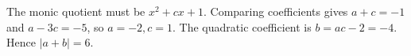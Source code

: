 The monic quotient must be $x^2+cx+1$. Comparing coefficients gives $a+c=-1$ and $a-3c=-5$, so $a=-2,c=1$. The quadratic coefficient is $b=ac-2=-4$. Hence $|a+b|=\boxed6$.
